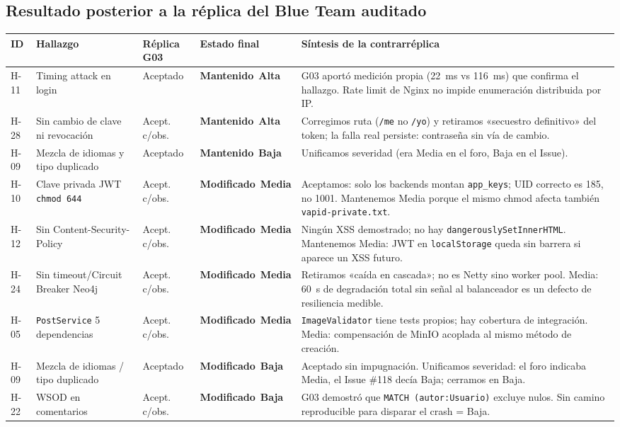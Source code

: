 \documentclass[10pt,a4paper]{article}
\newcommand{\code}[1]{\nolinkurl{#1}}
\newcommand{\badgeAlta}{\colorbox{orange!20}{\textcolor{orange!90!black}{\textbf{\footnotesize Alta}}}}
\newcommand{\badgeMedia}{\colorbox{yellow!35}{\textcolor{brown!90!black}{\textbf{\footnotesize Media}}}}
\newcommand{\badgeBaja}{\colorbox{blue!15}{\textcolor{blue!80!black}{\textbf{\footnotesize Baja}}}}
\newcommand{\badgeMantenido}{\colorbox{red!15}{\textcolor{red!70!black}{\textbf{\footnotesize Mantenido}}}}
\newcommand{\badgeModificado}{\colorbox{yellow!30}{\textcolor{brown!80!black}{\textbf{\footnotesize Modificado}}}}
\begin{document}
\subsection{Resultado posterior a la réplica del Blue Team auditado}

\begin{tabularx}{\textwidth}{p{0.8cm} p{3.5cm} p{1.8cm} p{1.5cm} X}
\rowcolor{tableheader}\toprule
ID & Hallazgo & Réplica G03 & Estado final & Síntesis de la contrarréplica \\ \midrule
H-11 & Timing attack en login & Aceptado & \badgeMantenido\ \badgeAlta & G03 aportó medición propia (22~ms vs 116~ms) que confirma el hallazgo. Rate limit de Nginx no impide enumeración distribuida por IP. \\ \midrule
H-28 & Sin cambio de clave ni revocación & Acept. c/obs. & \badgeMantenido\ \badgeAlta & Corregimos ruta (\code{/me} no \code{/yo}) y retiramos «secuestro definitivo» del token; la falla real persiste: contraseña sin vía de cambio. \\ \midrule
H-09 & Mezcla de idiomas y tipo duplicado & Aceptado & \badgeMantenido\ \badgeBaja & Unificamos severidad (era Media en el foro, Baja en el Issue). \\ \midrule
H-10 & Clave privada JWT \code{chmod 644} & Acept. c/obs. & \badgeModificado\ \badgeMedia & Aceptamos: solo los backends montan \code{app\_keys}; UID correcto es 185, no 1001. Mantenemos Media porque el mismo chmod afecta también \code{vapid-private.txt}. \\ \midrule
H-12 & Sin Content-Security-Policy & Acept. c/obs. & \badgeModificado\ \badgeMedia & Ningún XSS demostrado; no hay \code{dangerouslySetInnerHTML}. Mantenemos Media: JWT en \code{localStorage} queda sin barrera si aparece un XSS futuro. \\ \midrule
H-24 & Sin timeout/Circuit Breaker Neo4j & Acept. c/obs. & \badgeModificado\ \badgeMedia & Retiramos «caída en cascada»; no es Netty sino worker pool. Media: 60~s de degradación total sin señal al balanceador es un defecto de resiliencia medible. \\ \midrule
H-05 & \code{PostService} 5 dependencias & Acept. c/obs. & \badgeModificado\ \badgeMedia & \code{ImageValidator} tiene tests propios; hay cobertura de integración. Media: compensación de MinIO acoplada al mismo método de creación. \\ \midrule
H-09 & Mezcla de idiomas / tipo duplicado & Aceptado & \badgeModificado\ \badgeBaja & Aceptado sin impugnación. Unificamos severidad: el foro indicaba Media, el Issue \#118 decía Baja; cerramos en Baja. \\ \midrule
H-22 & WSOD en comentarios & Acept. c/obs. & \badgeModificado\ \badgeBaja & G03 demostró que \code{MATCH (autor:Usuario)} excluye nulos. Sin camino reproducible para disparar el crash = Baja. \\ \bottomrule
\end{tabularx}
\end{document}
